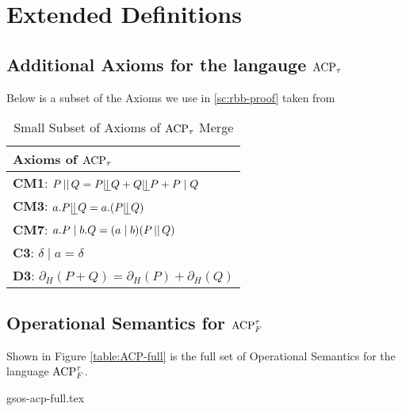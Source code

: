 \documentclass[../hons_project.tex]{subfiles}
\begin{document}
\section{Extended Definitions}

\subsection{Additional Axioms for the langauge \texorpdfstring{$\acpt$}{acpt}}
Below is a subset of the Axioms we use in \cref{sc:rbb-proof} taken from \cite{bergstraACPtUniversalAxiom1989}

\begin{table}[ht!]
	\centering
	\begin{tabular}{ |l| }
		\hline
		\textbf{Axioms of $\acpt$} \\
		\hline
		\textbf{CM1}: $P \merge Q = P \leftmerge Q + Q \leftmerge P + P \mid Q$ \\ [1ex]
		\textbf{CM3}: $a.P \leftmerge Q = a.(P \leftmerge Q)$\\ [1ex]
		\textbf{CM7}: $a.P \mid b.Q = (a \mid b)(P \merge Q)$ \\ [1ex] 
		\textbf{C3}: $\delta \mid a = \delta$ \\ [1ex] 
		\textbf{D3}: $\partial_{H}(P + Q) = \partial_{H}(P) +\partial_{H}(Q)$ \\ [1ex] 
		\hline
	\end{tabular}
	\caption{Small Subset of Axioms of $\acpt$ Merge}
	\label{table:acpt-axioms}
\end{table}

\subsection{Operational Semantics for \texorpdfstring{$\acptf$}{acptf}}\label{ssec:acptf-sos-full}

Shown in Figure \ref{table:ACP-full} is the full set of Operational Semantics for the language $\acptf$. 

{gsos-acp-full.tex}
\end{document}
